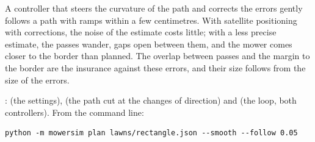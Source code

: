 \begin{inwords}
  A controller that steers the curvature of the path and corrects the
  errors gently follows a path with ramps within a few centimetres. With
  satellite positioning with corrections, the noise of the estimate costs
  little; with a less precise estimate, the passes wander, gaps open
  between them, and the mower comes closer to the border than planned. The
  overlap between passes and the margin to the border are the insurance
  against these errors, and their size follows from the size of the errors.
\end{inwords}

\begin{incode}
  :  (the settings),
   (the path cut at the changes of direction) and
   (the loop, both controllers). From the command line:
  \begin{verbatim}
python -m mowersim plan lawns/rectangle.json --smooth --follow 0.05
  \end{verbatim}
\end{incode}
